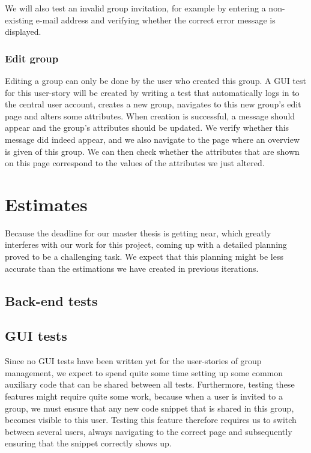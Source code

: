 \documentclass[10pt,a4paper,BCOR12mm, headexclude, footexclude,
  twoside, openright]{scrartcl}
\numberwithin{equation}{section} %
\numberwithin{figure}{section} %
\numberwithin{table}{section} %
\begin{document}
We will also test an invalid group invitation, for example by entering a non-existing e-mail address and verifying whether the correct error message is displayed.

\subsubsection*{Edit group}

Editing a group can only be done by the user who created this group.
A GUI test for this user-story will be created by writing a test that automatically logs in to the central user account, creates a new group, navigates to this new group's edit page and alters some attributes.
When creation is successful, a message should appear and the group's attributes should be updated.
We verify whether this message did indeed appear, and we also navigate to the page where an overview is given of this group.
We can then check whether the attributes that are shown on this page correspond to the values of the attributes we just altered.

\section{Estimates}
Because the deadline for our master thesis is getting near, which greatly interferes with our work for this project, coming up with a detailed planning proved to be a challenging task.
We expect that this planning might be less accurate than the estimations we have created in previous iterations.

\subsection{Back-end tests}

\subsection{GUI tests}
Since no GUI tests have been written yet for the user-stories of group management, we expect to spend quite some time setting up some common auxiliary code that can be shared between all tests.
Furthermore, testing these features might require quite some work, because when a user is invited to a group, we must ensure that any new code snippet that is shared in this group, becomes visible to this user.
Testing this feature therefore requires us to switch between several users, always navigating to the correct page and subsequently ensuring that the snippet correctly shows up.
\end{document}
